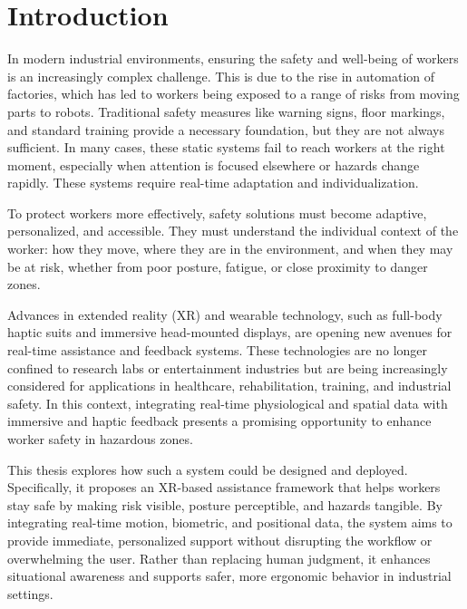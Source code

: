 \chapter{Introduction}
In modern industrial environments, ensuring the safety and well-being of workers is an increasingly complex challenge. This is due to the rise in automation of factories, which has led to workers being exposed to a range of risks from moving parts to robots. Traditional safety measures like warning signs, floor markings, and standard training provide a necessary foundation, but they are not always sufficient. In many cases, these static systems fail to reach workers at the right moment, especially when attention is focused elsewhere or hazards change rapidly. These systems require real-time adaptation and individualization.

To protect workers more effectively, safety solutions must become adaptive, personalized, and accessible. They must understand the individual context of the worker: how they move, where they are in the environment, and when they may be at risk, whether from poor posture, fatigue, or close proximity to danger zones.

Advances in extended reality (XR) and wearable technology, such as full-body haptic suits and immersive head-mounted displays, are opening new avenues for real-time assistance and feedback systems. These technologies are no longer confined to research labs or entertainment industries but are being increasingly considered for applications in healthcare, rehabilitation, training, and industrial safety. In this context, integrating real-time physiological and spatial data with immersive and haptic feedback presents a promising opportunity to enhance worker safety in hazardous zones. 


This thesis explores how such a system could be designed and deployed. Specifically, it proposes an XR-based assistance framework that helps workers stay safe by making risk visible, posture perceptible, and hazards tangible. By integrating real-time motion, biometric, and positional data, the system aims to provide immediate, personalized support without disrupting the workflow or overwhelming the user. Rather than replacing human judgment, it enhances situational awareness and supports safer, more ergonomic behavior in industrial settings.